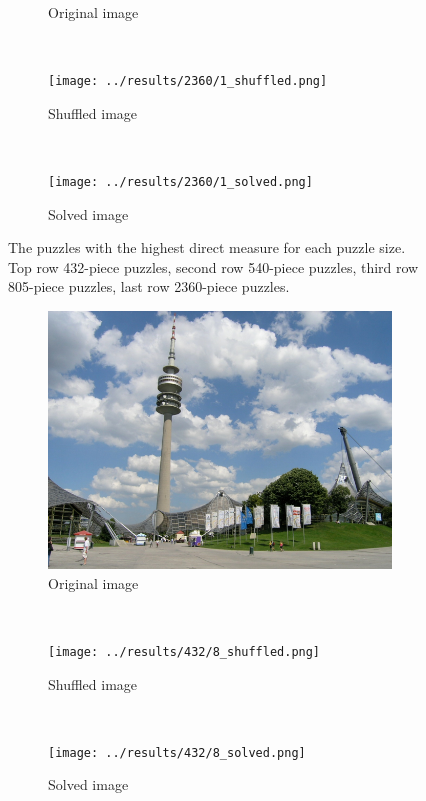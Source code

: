 \documentclass[11pt]{report}
\begin{document}
\begin{figure}
\begin{subfigure}[b]{0.3\textwidth}
		\caption{Original image}
	\end{subfigure}
	~
	\begin{subfigure}[b]{0.3\textwidth}
		\texttt{[image: ../results/2360/1\_shuffled.png]}
		\caption{Shuffled image}
	\end{subfigure}
	~
	\begin{subfigure}[b]{0.3\textwidth}
		\texttt{[image: ../results/2360/1\_solved.png]}
		\caption{Solved image}
	\end{subfigure}
	\caption{The puzzles with the highest direct measure for each puzzle size.
    Top row 432-piece puzzles, second row 540-piece puzzles, third row 805-piece
    puzzles, last row 2360-piece puzzles.}
	\label{fig:directMeasure}
\end{figure}

\begin{figure}
	\centering
	\begin{subfigure}[b]{0.3\textwidth}
		\includegraphics[width=\textwidth]{../imData/432/8.png}
		\caption{Original image}
	\end{subfigure}
	~
	\begin{subfigure}[b]{0.3\textwidth}
		\texttt{[image: ../results/432/8\_shuffled.png]}
		\caption{Shuffled image}
	\end{subfigure}
	~
	\begin{subfigure}[b]{0.3\textwidth}
		\texttt{[image: ../results/432/8\_solved.png]}
		\caption{Solved image}
	\end{subfigure}
  ~
  \begin{subfigure}[b]{0.3\textwidth}

\end{subfigure}
\end{figure}
\end{document}
